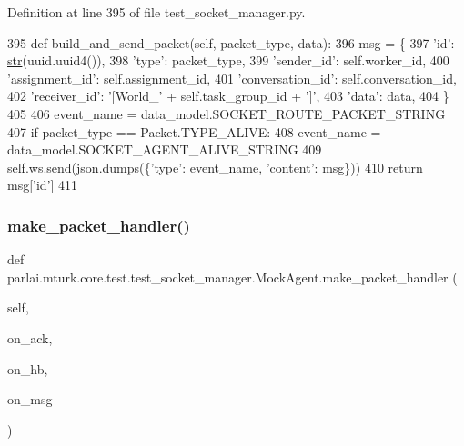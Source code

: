 Definition at line 395 of file test\+\_\+socket\+\_\+manager.\+py.


\begin{DoxyCode}
395     \textcolor{keyword}{def }build\_and\_send\_packet(self, packet\_type, data):
396         msg = \{
397             \textcolor{stringliteral}{'id'}: \hyperlink{namespacegenerate__task__READMEs_a5b88452ffb87b78c8c85ececebafc09f}{str}(uuid.uuid4()),
398             \textcolor{stringliteral}{'type'}: packet\_type,
399             \textcolor{stringliteral}{'sender\_id'}: self.worker\_id,
400             \textcolor{stringliteral}{'assignment\_id'}: self.assignment\_id,
401             \textcolor{stringliteral}{'conversation\_id'}: self.conversation\_id,
402             \textcolor{stringliteral}{'receiver\_id'}: \textcolor{stringliteral}{'[World\_'} + self.task\_group\_id + \textcolor{stringliteral}{']'},
403             \textcolor{stringliteral}{'data'}: data,
404         \}
405 
406         event\_name = data\_model.SOCKET\_ROUTE\_PACKET\_STRING
407         \textcolor{keywordflow}{if} packet\_type == Packet.TYPE\_ALIVE:
408             event\_name = data\_model.SOCKET\_AGENT\_ALIVE\_STRING
409         self.ws.send(json.dumps(\{\textcolor{stringliteral}{'type'}: event\_name, \textcolor{stringliteral}{'content'}: msg\}))
410         \textcolor{keywordflow}{return} msg[\textcolor{stringliteral}{'id'}]
411 
\end{DoxyCode}
\mbox{\label{classparlai_1_1mturk_1_1core_1_1test_1_1test__socket__manager_1_1MockAgent_a06d5e6cb09b2472a0b1972a7bb82ef31}} 
\subsubsection{\texorpdfstring{make\+\_\+packet\+\_\+handler()}{make\_packet\_handler()}}
{\footnotesize\ttfamily def parlai.\+mturk.\+core.\+test.\+test\+\_\+socket\+\_\+manager.\+Mock\+Agent.\+make\+\_\+packet\+\_\+handler (\begin{DoxyParamCaption}\item[{}]{self,  }\item[{}]{on\+\_\+ack,  }\item[{}]{on\+\_\+hb,  }\item[{}]{on\+\_\+msg }\end{DoxyParamCaption})}

